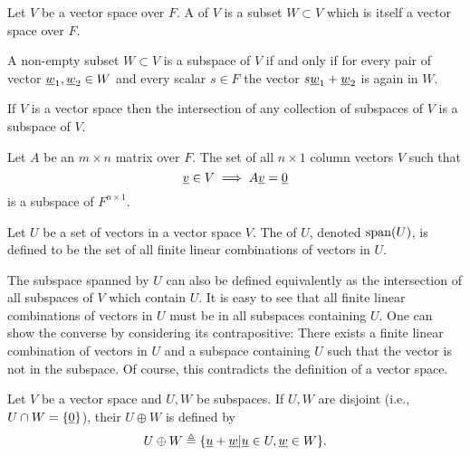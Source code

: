 \begin{definition}
Let $V$ be a vector space over $F$.
A  of $V$ is a subset $W \subset V$ which is itself a vector space over $F$.
\end{definition}

\begin{fact}
A non-empty subset $W \subset V$ is a subspace of $V$ if and only if for every pair of vector $\underline{w}_1, \underline{w}_2 \in W$ and every scalar $s \in F$ the vector $s \underline{w}_1 + \underline{w}_2$ is again in $W$.
\end{fact}
If $V$ is a vector space then the intersection of any collection of subspaces of $V$ is a subspace of $V$.

\begin{example}
Let $A$ be an $m \times n$ matrix over $F$.
The set of all $n \times 1$ column vectors $V$ such that
\begin{equation*}
\underline{v} \in V \implies A \underline{v} = \underline{0}
\end{equation*}
is a subspace of $F^{n \times 1}$.
\end{example}

\begin{definition}
Let $U$ be a set of vectors in a vector space $V$.
The  of $U$, denoted $\mathrm{span}(U)$, is defined to be the set of all finite linear combinations of vectors in $U$.
\end{definition}
The subspace spanned by $U$ can also be defined equivalently as the intersection of all subspaces of $V$ which contain $U$.
It is easy to see that all finite linear combinations of vectors in $U$ must be in all subspaces containing $U$.
One can show the converse by considering its contrapositive: There exists a finite linear combination of vectors in $U$ and a subspace containing $U$ such that the vector is not in the subspace.
Of course, this contradicts the definition of a vector space.

\begin{definition}
Let $V$ be a vector space and $U,W$ be subspaces.
If $U,W$ are disjoint (i.e., $U\cap W = \{ \underline{0} \}$), their  $U \oplus W$ is defined by
\[ U \oplus W \triangleq \{\underline{u}+\underline{w} | \underline{u} \in U, \underline{w} \in W \}. \]
\end{definition}

